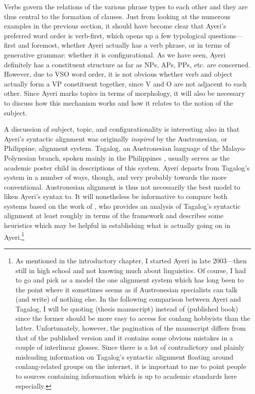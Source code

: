 Verbs govern the relations of the various phrase types to each other and they
are thus central to the formation of clauses. Just from looking at the numerous
examples in the previous section, it should have become clear that Ayeri's
preferred word order is verb-first, which opens up a few typological
questions---first and foremost, whether Ayeri actually has a verb phrase, or in
terms of generative grammar: whether it is configurational. As we have seen,
Ayeri definitely has a constituent structure as far as NPs, APs, PPs, etc. are
concerned. However, due to VSO word order, it is not obvious whether verb and
object actually form a VP constituent together, since V and O are not adjacent
to each other. Since Ayeri marks topics in terms of morphology, it will also be
necessary to discuss how this mechanism works and how it relates to the notion
of the subject.

A discussion of subject, topic, and configurationality is interesting also in
that Ayeri's syntactic alignment was originally \emph{inspired} by the
Austronesian, or Philippine, alignment system. Tagalog, an Austronesian
language of the Malayo-Polynesian branch, spoken mainly in the Philippines
\parencites{glottolog:tgl}{schachterotanes1972}, usually serves as the
academic poster child in descriptions of this system. Ayeri departs from
Tagalog's system in a number of ways, though, and very probably towards the
more conventional. Austronesian alignment is thus not necessarily the best
model to liken Ayeri's syntax to. It will nonetheless be informative to compare
both systems based on the work of \textcites{kroeger1991}{kroeger1993a}, who
provides an analysis of Tagalog's syntactic alignment at least roughly in terms
of the \Lfg{} framework and describes some heuristics which may be helpful in
establishing what is actually going on in Ayeri.\footnote{As mentioned in the
introductory chapter, I started Ayeri in late 2003---then still in high school
and not knowing much about linguistics. Of course, I had to go and pick as a
model the one alignment system which has long been  to the
point where it  {sometimes seems as if Austronesian
specialists can talk (and write) of nothing else}. In the following comparison
between Ayeri and Tagalog, I will be quoting \citet{kroeger1991} (thesis
manuscript) instead of \citet{kroeger1993b} (published book) since the former
should be more easy to access for conlang hobbyists than the latter.
Unfortunately, however, the pagination of the manuscript differs from that of
the published version and it contains some obvious mistakes in a couple of
interlinear glosses. Since there is a lot of contradictory and plainly
misleading information on Tagalog's syntactic alignment floating around
conlang-related groups on the internet, it is important to me to point people
to sources containing information which is up to academic standards here
especially.}

